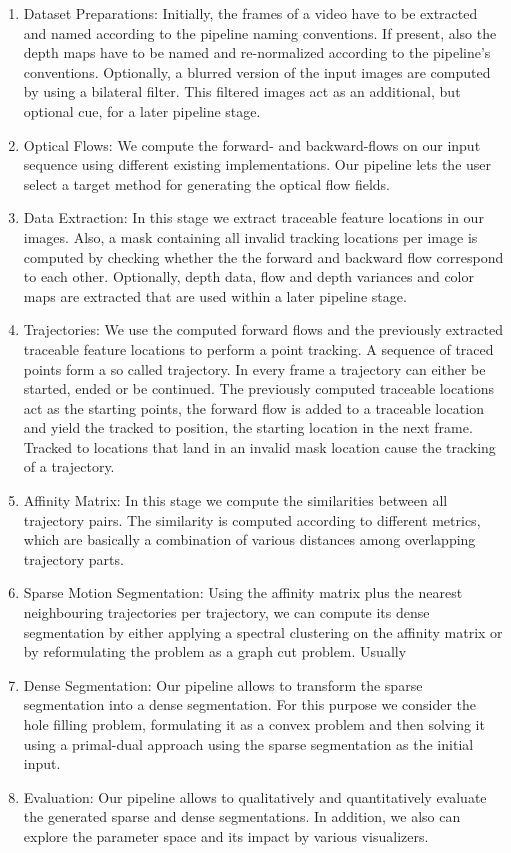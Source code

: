 \begin{enumerate}
\item Dataset Preparations: Initially, the frames of a video have to be extracted and named according to the pipeline naming conventions. If present, also the depth maps have to be named and re-normalized according to the pipeline's conventions. Optionally, a blurred version of the input images are computed by using a bilateral filter. This filtered images act as an additional, but optional cue, for a later pipeline stage. 
\item Optical Flows: We compute the forward- and backward-flows on our input sequence using different existing implementations. Our pipeline lets the user select a target method for generating the optical flow fields.
\item Data Extraction: In this stage we extract traceable feature locations in our images. Also, a mask containing all invalid tracking locations per image is computed by checking whether the the forward and backward flow correspond to each other. Optionally, depth data, flow and depth variances and color maps are extracted that are used within a later pipeline stage. 
\item Trajectories: We use the computed forward flows and the previously extracted traceable feature locations to perform a point tracking. A sequence of traced points form a so called trajectory. In every frame a trajectory can either be started, ended or be continued. The previously computed traceable locations act as the starting points, the forward flow is added to a traceable location and yield the tracked to position, the starting location in the next frame. Tracked to locations that land in an invalid mask location cause the tracking of a trajectory. 
\item Affinity Matrix: In this stage we compute the similarities between all trajectory pairs. The similarity is computed according to different metrics, which are basically a combination of various distances among overlapping trajectory parts. 
\item Sparse Motion Segmentation: Using the affinity matrix plus the nearest neighbouring trajectories per trajectory, we can compute its dense segmentation by either applying a spectral clustering on the affinity matrix or by reformulating the problem as a graph cut problem. Usually 
\item Dense Segmentation: Our pipeline allows to transform the sparse segmentation into a dense segmentation. For this purpose we consider the hole filling problem, formulating it as a convex problem and then solving it using a primal-dual approach using the sparse segmentation as the initial input.
\item Evaluation: Our pipeline allows to qualitatively and quantitatively evaluate the generated sparse and dense segmentations. In addition, we also can explore the parameter space and its impact by various visualizers.
\end{enumerate}

